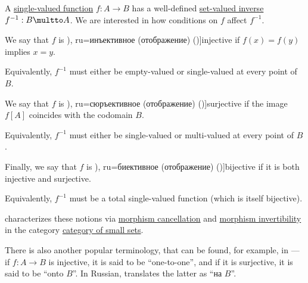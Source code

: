 \begin{definition}\label{def:function_invertibility}
  A \hyperref[def:function]{single-valued function} \( f: A \to B \) has a well-defined \hyperref[def:set_valued_function/inverse]{set-valued inverse} \( f^{-1}: B \multto A \). We are interested in how conditions on \( f \) affect \( f^{-1} \).
  \begin{thmenum}
     We say that \( f \) is \term[bg=инективно (изображение) (\cite[150]{Станилов1974АналитичнаГеометрия}), ru=инъективное (отображение) (\cite[41]{БелоусовТкачёв2004ДискретнаяМатематика})]{injective} if \( f(x) = f(y) \) implies \( x = y \).

    Equivalently, \( f^{-1} \) must either be empty-valued or single-valued at every point of \( B \).

     We say that \( f \) is \term[bg=сюрективно (изображение) (\cite[150]{Станилов1974АналитичнаГеометрия}), ru=сюръективное (отображение) (\cite[42]{БелоусовТкачёв2004ДискретнаяМатематика})]{surjective} if the image \( f[A] \) coincides with the codomain \( B \).

    Equivalently, \( f^{-1} \) must either be single-valued or multi-valued at every point of \( B \).

     Finally, we say that \( f \) is \term[bg=биективно (изображение) (\cite[150]{Станилов1974АналитичнаГеометрия}), ru=биективное (отображение) (\cite[42]{БелоусовТкачёв2004ДискретнаяМатематика})]{bijective} if it is both injective and surjective.

    Equivalently, \( f^{-1} \) must be a total single-valued function (which is itself bijective).
  \end{thmenum}
\end{definition}
\begin{comments}
  \item {} characterizes these notions via \hyperref[def:morphism_cancellation]{morphism cancellation} and \hyperref[def:morphism_invertibility]{morphism invertibility} in the category \hyperref[def:category_of_small_sets]{category of small sets}.

  \item There is also another popular terminology, that can be found, for example, in \cite[31; 32]{Halmos1960NaiveSetTheory} --- if \( f: A \to B \) is injective, it is said to be \enquote{one-to-one}, and if it is surjective, it is said to be \enquote{onto \( B \)}. In Russian, \textcite[15]{Мальцев1970АлгебраическиеСистемы} translates the latter as \enquote{на \( B \)}.
\end{comments}

